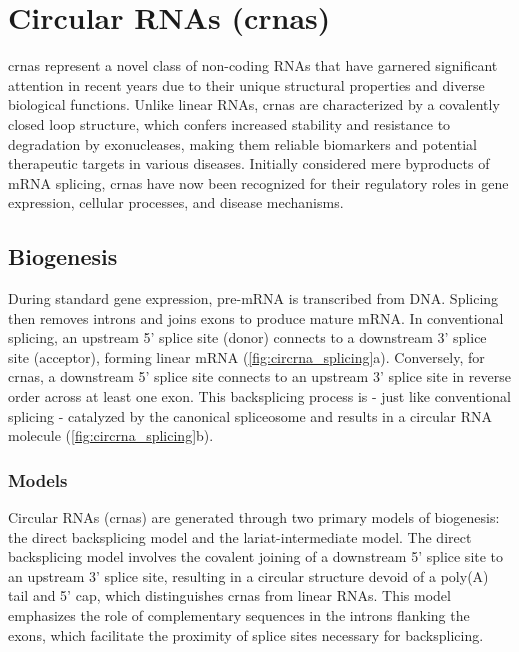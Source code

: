 \section{Circular RNAs (\gls{crna}s)}
\label{sec:circrnas}

\Gls{crna}s represent a novel class of non-coding RNAs that have garnered
significant attention in recent years due to their unique structural properties
and diverse biological functions.
Unlike linear RNAs, \gls{crna}s are characterized by a covalently closed loop
structure, which confers increased stability and resistance to degradation by
exonucleases, making them reliable biomarkers and potential therapeutic targets
in various
diseases\supercite{ma_circular_2020,hoque_exploring_2023,wilusz_circular_2017}.
Initially considered mere byproducts of mRNA splicing, \gls{crna}s have now
been recognized for their regulatory roles in gene expression, cellular
processes, and disease
mechanisms\supercite{cherubini_foxp1_2019,wilusz_360_2018}.

\subsection{Biogenesis}
\label{sec:circrna_biogenesis}
During standard gene expression, pre-mRNA is transcribed from DNA.
Splicing then removes introns and joins exons to produce mature
mRNA\supercite{black_mechanisms_2003}.
In conventional splicing, an upstream 5' splice site (donor) connects to a
downstream 3' splice site (acceptor), forming linear mRNA
(\cref{fig:circrna_splicing}a).
Conversely, for \gls{crna}s, a downstream 5' splice site connects to an
upstream 3' splice site in reverse order across at least one
exon\supercite{chen_expanding_2020}.
This backsplicing process is - just like conventional splicing - catalyzed by
the canonical spliceosome\supercite{starke_exon_2015} and results in a circular
RNA molecule (\cref{fig:circrna_splicing}b).

\subsubsection{Models}

Circular RNAs (\gls{crna}s) are generated through two primary models of
biogenesis: the direct backsplicing model and the lariat-intermediate model.
The direct backsplicing model involves the covalent joining of a downstream 5'
splice site to an upstream 3' splice site, resulting in a circular structure
devoid of a poly(A) tail and 5' cap, which distinguishes \gls{crna}s from
linear RNAs\supercite{zhang_complementary_2014,ferreira_circular_2018}.
This model emphasizes the role of complementary sequences in the introns
flanking the exons, which facilitate the proximity of splice sites necessary
for backsplicing\supercite{zhang_complementary_2014,meganck_engineering_2021}.

